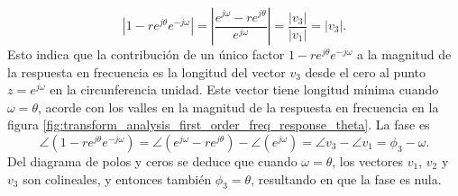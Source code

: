 \documentclass[a4paper]{report}
\begin{document}
\[
 |1-re^{j\theta}e^{-j\omega}|=\left|\frac{e^{j\omega}-re^{j\theta}}{e^{j\omega}}\right|=\frac{|v_3|}{|v_1|}=|v_3|.
\]
Esto indica que la contribución de un único factor \(1-re^{j\theta}e^{-j\omega}\) a la magnitud de la respuesta en frecuencia es la longitud del vector \(v_3\) desde el cero al punto \(z=e^{j\omega}\) en la circunferencia unidad. Este vector tiene longitud mínima cuando \(\omega=\theta\), acorde con los valles en la magnitud de la respuesta en frecuencia en la figura \ref{fig:transform_analysis_first_order_freq_response_theta}.
La fase es
\[
 \angle(1-re^{j\theta}e^{-j\omega})=\angle(e^{j\omega}-re^{j\theta})-\angle(e^{j\omega})
  =\angle v_3-\angle v_1=\phi_3-\omega.
\]
Del diagrama de polos y ceros se deduce que cuando \(\omega=\theta\), los vectores \(v_1\), \(v_2\) y \(v_3\) son colineales, y entonces también \(\phi_3=\theta\), resultando en que la fase es nula.
\end{document}
